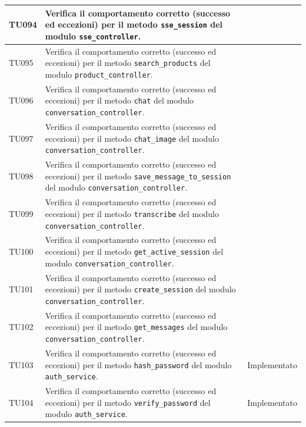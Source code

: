 \documentclass[a4paper,11pt,oneside]{scrartcl}
\begin{document}
\begin{longtable}{|p{1.9cm}|p{11.6cm}|c|}
    TU094           & Verifica il comportamento corretto (successo ed eccezioni) per il metodo \texttt{sse\_session} del modulo \texttt{sse\_controller}.                          &                \\ \hline
    TU095           & Verifica il comportamento corretto (successo ed eccezioni) per il metodo \texttt{search\_products} del modulo \texttt{product\_controller}.                  &                \\ \hline
    TU096           & Verifica il comportamento corretto (successo ed eccezioni) per il metodo \texttt{chat} del modulo \texttt{conversation\_controller}.                         &                \\ \hline
    TU097           & Verifica il comportamento corretto (successo ed eccezioni) per il metodo \texttt{chat\_image} del modulo \texttt{conversation\_controller}.                  &                \\ \hline
    TU098           & Verifica il comportamento corretto (successo ed eccezioni) per il metodo \texttt{save\_message\_to\_session} del modulo \texttt{conversation\_controller}.   &                \\ \hline
    TU099           & Verifica il comportamento corretto (successo ed eccezioni) per il metodo \texttt{transcribe} del modulo \texttt{conversation\_controller}.                   &                \\ \hline
    TU100           & Verifica il comportamento corretto (successo ed eccezioni) per il metodo \texttt{get\_active\_session} del modulo \texttt{conversation\_controller}.         &                \\ \hline
    TU101           & Verifica il comportamento corretto (successo ed eccezioni) per il metodo \texttt{create\_session} del modulo \texttt{conversation\_controller}.              &                \\ \hline
    TU102           & Verifica il comportamento corretto (successo ed eccezioni) per il metodo \texttt{get\_messages} del modulo \texttt{conversation\_controller}.                &                \\ \hline
    TU103           & Verifica il comportamento corretto (successo ed eccezioni) per il metodo \texttt{hash\_password} del modulo \texttt{auth\_service}.                          & Implementato   \\ \hline
    TU104           & Verifica il comportamento corretto (successo ed eccezioni) per il metodo \texttt{verify\_password} del modulo \texttt{auth\_service}.                        & Implementato   \\ \hline

\end{longtable}
\end{document}
